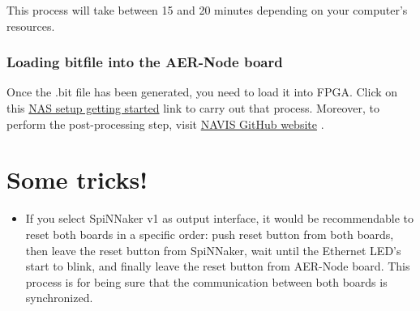 This process will take between 15 and 20 minutes depending on your computer's resources.


\subsubsection{Loading bitfile into the AER-Node board}

Once the .bit file has been generated, you need to load it into FPGA. Click on this \textcolor{blue}{ \href{https://github.com/RTC-research-group/AERtools/tree/master/AERNode/NAS/NAS_user_manual}{NAS setup getting started}} link to carry out that process. Moreover, to perform the post-processing step, visit \textcolor{blue}{ \href{https://github.com/jpdominguez/NAVIS-Tool}{NAVIS GitHub website}} \cite{dominguez2017navis}.

\newpage
\section{Some tricks!}

\begin{itemize}
    \item If you select SpiNNaker v1 as output interface, it would be recommendable to reset both boards in a specific order: push reset button from both boards, then leave the reset button from SpiNNaker, wait until the Ethernet LED's start to blink, and finally leave the reset button from AER-Node board. This process is for being sure that the communication between both boards is synchronized.
\end{itemize}{}

\newpage

 

